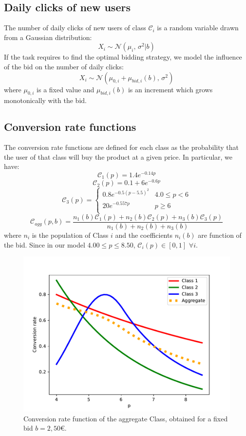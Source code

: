 \documentclass[12pt,a4paper]{report}
\begin{document}
			\subsection{Daily clicks of new users}
The number of daily clicks of new users of class $\mathcal C_i$ is a random variable drawn from a Gaussian distribution:
\[ X_i\sim \mathcal{N}(\mu_i,\,\sigma^{2}|b)\]
If the task requires to find the optimal bidding strategy, we model the influence of the bid on the number of daily clicks:
\[ X_i \sim \mathcal{N}(\mu_{0,i}+\mu_{bid,i}(b),\,\sigma^{2})\]
where $\mu_{0,i}$ is a fixed value and $\mu_{bid,i}(b)$ is an increment which grows monotonically with the bid.

			\subsection{Conversion rate functions}
The conversion rate functions are defined for each class as the probability that the user of that class will buy the product at a given price. In particular, we have:
\[ \mathcal C_1(p) =  1.4 e^{-0.14p}    \]
\[ \mathcal C_2(p) = 0.1+ 6 e^{-0.6p}    \]
\[   \mathcal C_3(p) = \left\{
\begin{array}{ll}
      0.8 e^{-0.5(p-5.5)^2} & 4.0\leq p< 6 \\
      20 e^{-0.557p} & p \geq 6 \\
\end{array} 
\right. \]
\[ \mathcal C_{agg}(p, b) =\frac{n_1(b)\mathcal C_1(p)+n_2(b)\mathcal C_2(p)+n_3(b)\mathcal C_3(p)}{n_1(b)+n_2(b)+n_3(b)}\] 
where $n_i$ is the population of Class $i$ and the coefficients $n_i(b)$ are function of the bid.
Since in our model $4.00 \leq p \leq 8.50$, $\mathcal C_i(p) \in [0,1]$ $ \forall i$.
\begin{figure}[H]
\centering
  \includegraphics[scale = 0.7, center]{Cagg}
  \caption{Conversion rate function of the aggregate Class, obtained for a fixed bid $b=2,50$\euro.}
\end{figure}
\end{document}
